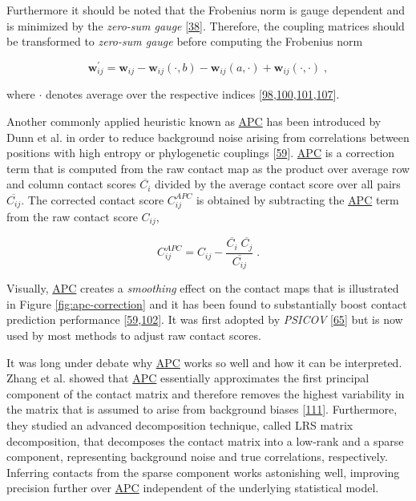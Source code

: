 \documentclass[11pt,a4paper,twoside]{book}
\newcommand{\w}{\mathbf{w}}
\newcommand{\wij}{\mathbf{w}_{ij}}
\theoremstyle{definition}
\theoremstyle{definition}
\theoremstyle{remark}
\begin{document}
Furthermore it should be noted that the Frobenius norm is gauge
dependent and is minimized by the \emph{zero-sum gauge}
{[}\protect\hyperlink{ref-Weigt2009}{38}{]}. Therefore, the coupling
matrices should be transformed to \emph{zero-sum gauge} before computing
the Frobenius norm

\begin{equation}
    \w^{\prime}_{ij}  = \wij - \wij(\cdot, b) - \wij(a, \cdot) + \wij(\cdot, \cdot) \; ,
\label{eq:zero-sum-gauge-transform}
\end{equation}

where \(\cdot\) denotes average over the respective indices
{[}\protect\hyperlink{ref-Ekeberg2013}{98},\protect\hyperlink{ref-Seemayer2014}{100},\protect\hyperlink{ref-Ekeberg2014}{101},\protect\hyperlink{ref-Baldassi2014}{107}{]}.

Another commonly applied heuristic known as
\protect\hyperlink{abbrev}{APC} has been introduced by Dunn et al. in
order to reduce background noise arising from correlations between
positions with high entropy or phylogenetic couplings
{[}\protect\hyperlink{ref-Dunn2008}{59}{]}.
\protect\hyperlink{abbrev}{APC} is a correction term that is computed
from the raw contact map as the product over average row and column
contact scores \(\overline{C_i}\) divided by the average contact score
over all pairs \(\overline{C_{ij}}\). The corrected contact score
\(C_{ij}^{APC}\) is obtained by subtracting the
\protect\hyperlink{abbrev}{APC} term from the raw contact score
\(C_{ij}\),

\begin{equation}
    C_{ij}^{APC}  = C_{ij} - \frac{\overline{C_i} \; \overline{C_j}}{\overline{C_{ij}}}\; .
\label{eq:apc}
\end{equation}

Visually, \protect\hyperlink{abbrev}{APC} creates a \emph{smoothing}
effect on the contact maps that is illustrated in Figure
\ref{fig:apc-correction} and it has been found to substantially boost
contact prediction performance
{[}\protect\hyperlink{ref-Dunn2008}{59},\protect\hyperlink{ref-Kamisetty2013}{102}{]}.
It was first adopted by \emph{PSICOV}
{[}\protect\hyperlink{ref-Jones2012}{65}{]} but is now used by most
methods to adjust raw contact scores.

It was long under debate why \protect\hyperlink{abbrev}{APC} works so
well and how it can be interpreted. Zhang et al. showed that
\protect\hyperlink{abbrev}{APC} essentially approximates the first
principal component of the contact matrix and therefore removes the
highest variability in the matrix that is assumed to arise from
background biases {[}\protect\hyperlink{ref-Zhang2016}{111}{]}.
Furthermore, they studied an advanced decomposition technique, called
LRS matrix decomposition, that decomposes the contact matrix into a
low-rank and a sparse component, representing background noise and true
correlations, respectively.\\
Inferring contacts from the sparse component works astonishing well,
improving precision further over \protect\hyperlink{abbrev}{APC}
independent of the underlying statistical model.
\end{document}
